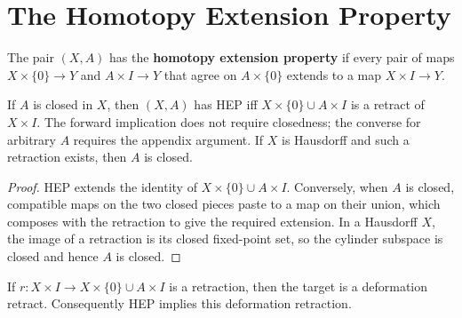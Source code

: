 \section{The Homotopy Extension Property}
\label{sec:homotopy-extension-property}

\begin{definition}
\label{def:homotopy-extension-property}





The pair $(X,A)$ has the \textbf{homotopy extension property} if every pair of maps
$X\times\{0\}\to Y$ and $A\times I\to Y$ that agree on $A\times\{0\}$ extends
to a map $X\times I\to Y$.
\end{definition}

\begin{proposition}
\label{prop:hep-iff-retract}




If $A$ is closed in $X$, then $(X,A)$ has HEP iff
$X\times\{0\}\cup A\times I$ is a retract of $X\times I$. The forward implication
does not require closedness; the converse for arbitrary $A$ requires the appendix
argument. If $X$ is Hausdorff and such a retraction exists, then $A$ is closed.
\end{proposition}

\begin{proof}

\sketch HEP extends the identity of
$X\times\{0\}\cup A\times I$. Conversely, when $A$ is closed, compatible maps on
the two closed pieces paste to a map on their union, which composes with the retraction
to give the required extension. In a Hausdorff $X$, the image of a retraction is its
closed fixed-point set, so the cylinder subspace is closed and hence $A$ is closed.
\end{proof}

\begin{lemma}
\label{lem:hep-cylinder-deformation-retract}





If $r:X\times I\to X\times\{0\}\cup A\times I$ is a retraction, then the target
is a deformation retract. Consequently HEP implies this deformation retraction.
\end{lemma}

